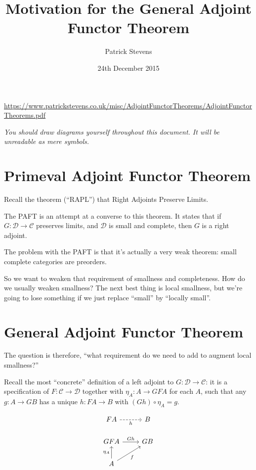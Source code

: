 \documentclass[11pt]{amsart}
\title{Motivation for the General Adjoint Functor Theorem}
\author{Patrick Stevens}
\date{24th December 2015}
\begin{document}
\maketitle
\tiny \begin{center} \url{https://www.patrickstevens.co.uk/misc/AdjointFunctorTheorems/AdjointFunctorTheorems.pdf} \end{center}

\normalsize
\emph{You should draw diagrams yourself throughout this document. It will be unreadable as mere symbols.}

\section{Primeval Adjoint Functor Theorem}

Recall the theorem (``RAPL'') that Right Adjoints Preserve Limits.

The PAFT is an attempt at a converse to this theorem.
It states that if $G: \mathcal{D} \to \mathcal{C}$ preserves limits, and $\mathcal{D}$ is small and complete, then $G$ is a right adjoint.

The problem with the PAFT is that it's actually a very weak theorem: small complete categories are preorders.

So we want to weaken that requirement of smallness and completeness.
How do we usually weaken smallness?
The next best thing is local smallness, but we're going to lose something if we just replace ``small'' by ``locally small''.

\section{General Adjoint Functor Theorem}
The question is therefore, ``what requirement do we need to add to augment local smallness?''

Recall the most ``concrete'' definition of a left adjoint to $G: \mathcal{D} \to \mathcal{C}$: it is a specification of $F: \mathcal{C} \to \mathcal{D}$ together with $\eta_A: A \to GFA$ for each $A$, such that any $g: A \to GB$ has a unique $h: FA \to B$ with $(Gh) \circ \eta_A = g$.

\[
\begin{tikzcd}
FA
    \arrow[r, dashrightarrow, "h"']
& B
\\
GFA
    \arrow[r, "Gh"]
& GB
\\
A
    \arrow[u, "\eta_A"]
    \arrow[ur, "f"']
&
\end{tikzcd}
\]
\end{document}
